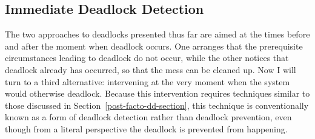 \subsection{Immediate Deadlock Detection}\label{immediate-dd-section}

The two approaches to deadlocks presented thus far are aimed
at the times before and after the moment when deadlock occurs.  One
arranges that the prerequisite circumstances leading to deadlock do
not occur, while the other notices that deadlock already has occurred,
so that the mess can be cleaned up.  Now I will turn to a third
alternative: intervening at the very moment when the system would
otherwise deadlock.  Because this intervention requires techniques similar to those discussed in Section~\ref{post-facto-dd-section}, this technique is conventionally known
as a form of deadlock detection rather than deadlock prevention, even
though from a literal perspective the deadlock is prevented from
happening.

